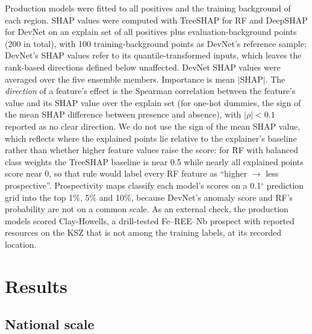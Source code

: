 \documentclass[pdflatex,sn-apa]{sn-jnl}
\begin{document}
Production models were fitted to all positives and the training background of each region. SHAP values \citep{Lundberg2017} were computed with TreeSHAP for RF \citep{Lundberg2020} and DeepSHAP for DevNet on an explain set of all positives plus evaluation-background points (200 in total), with 100 training-background points as DevNet's reference sample; DevNet's SHAP values refer to its quantile-transformed inputs, which leaves the rank-based directions defined below unaffected. DevNet SHAP values were averaged over the five ensemble members. Importance is mean $|$SHAP$|$. The \emph{direction} of a feature's effect is the Spearman correlation between the feature's value and its SHAP value over the explain set (for one-hot dummies, the sign of the mean SHAP difference between presence and absence), with $|\rho| < 0.1$ reported as no clear direction. We do not use the sign of the mean SHAP value, which reflects where the explained points lie relative to the explainer's baseline rather than whether higher feature values raise the score: for RF with balanced class weights the TreeSHAP baseline is near 0.5 while nearly all explained points score near 0, so that rule would label every RF feature as ``higher $\rightarrow$ less prospective''. Prospectivity maps classify each model's scores on a 0.1$^\circ$ prediction grid into the top 1\%, 5\% and 10\%, because DevNet's anomaly score and RF's probability are not on a common scale. As an external check, the production models scored Clay-Howells, a drill-tested Fe--REE--Nb prospect with reported resources on the KSZ \citep{OGS2011} that is not among the training labels, at its recorded location.

\section{Results}\label{sec:results}

\subsection{National scale}\label{sec:res-national}\label{sec:res-ladder}
\end{document}
